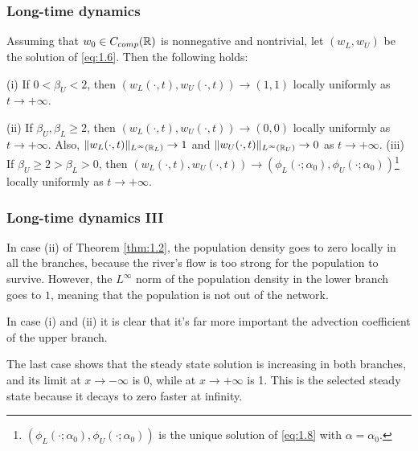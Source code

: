 
\begin{frame}[allowframebreaks]
    \frametitle{Long-time dynamics}
    \begin{theorem}
        Assuming that \(w_0 \in C_{comp}(\mathbb{R})\) is nonnegative and nontrivial, let \((w_L, w_U)\) be the solution of \eqref{eq:1.6}. Then the following holds:

            (i) If \(0 < \beta_U < 2\), then \((w_L(\cdot, t), w_U(\cdot, t)) \to (1, 1)\) locally uniformly as \(t \to +\infty\).

            (ii) If \(\beta_U, \beta_L \geq 2\), then \((w_L(\cdot, t), w_U(\cdot, t)) \to (0, 0)\) locally uniformly as \(t \to +\infty\). Also, \(\lVert w_L(\cdot, t)\rVert_{L^\infty(\mathbb{R}_L)} \to 1\) and \(\lVert w_U(\cdot, t)\rVert_{L^\infty(\mathbb{R}_U)} \to 0\) as \(t \to +\infty\).
            \theorembreak
            (iii) If \(\beta_U \geq 2 > \beta_L > 0\), then \((w_L(\cdot, t), w_U(\cdot, t)) \to (\phi_L(\cdot; \alpha_0), \phi_U(\cdot; \alpha_0))\)\footnote{\((\phi_L(\cdot; \alpha_0), \phi_U(\cdot; \alpha_0))\) is the unique solution of \eqref{eq:1.8} with \(\alpha = \alpha_0\).} locally uniformly as \(t \to +\infty\).
        \label{thm:1.2}
    \end{theorem}
\end{frame}


\begin{frame}
    \frametitle{Long-time dynamics III}
    In case (ii) of Theorem \ref{thm:1.2}, the population density goes to zero locally in all the branches, because the river's flow is too strong for the population to survive. However, the \(L^\infty\) norm of the population density in the lower branch goes to \(1\), meaning that the population is not out of the network.

    In case (i) and (ii) it is clear that it's far more important the advection coefficient of the upper branch.

    The last case shows that the steady state solution is increasing in both branches, and its limit at \(x \to -\infty\) is 0, while at \(x \to +\infty\) is 1. This is the selected steady state because it decays to zero faster at infinity.
\end{frame}